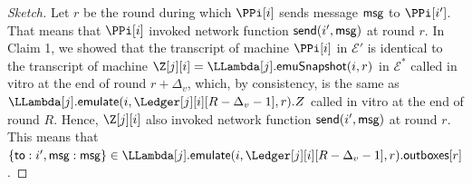 \begin{proof}[Sketch]





  Let $r$ be the round during which $\PPi[i]$ sends message $\textsf{msg}$ to $\PPi[i']$.
  That means that $\PPi[i]$ invoked network function $\textsf{send}(i', \textsf{msg})$ at round $r$.
  In Claim 1, we showed that the transcript of machine $\PPi[i]$ in $\mathcal{E}'$
  is identical to the transcript of machine $\Z[j][i] = \LLambda[j].\emulationSnapshot(i,r)$ in $\mathcal{E}^*$
  called in vitro at the end of round $r + \Delta_v$, which, by consistency, is the same as
  $\LLambda[j].\emulate(i, \Ledger[j][i][R - \Delta_v - 1], r).Z$ called in vitro at the end of round $R$.
  Hence, $\Z[j][i]$ also invoked network function $\textsf{send}(i', \textsf{msg})$ at round $r$.
  This means that $\{\textsf{to}: i', \msg: \msg\} \in \LLambda[j].\emulate(i, \Ledger[j][i][R - \Delta_v - 1], r).\outboxes[r]$.


\end{proof}
